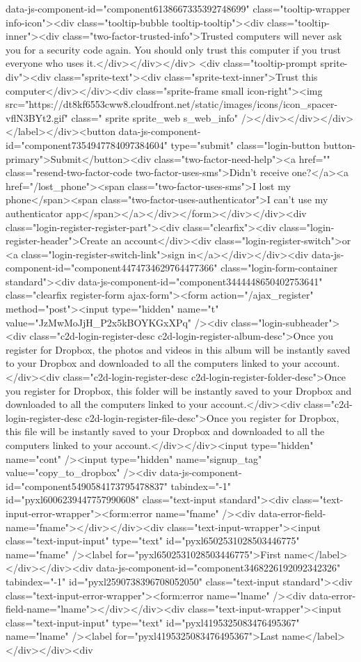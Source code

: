 {data-js-component-id="component6138667335392748699" class="tooltip-wrapper info-icon"><div class="tooltip-bubble tooltip-tooltip"><div class="tooltip-inner"><div class="two-factor-trusted-info">Trusted computers will never ask you for a security code again. You should only trust this computer if you trust everyone who uses it.</div></div></div> <div class="tooltip-prompt sprite-div"><div class="sprite-text"><div class="sprite-text-inner">Trust this computer</div></div><div class="sprite-frame small icon-right"><img src="https://dt8kf6553cww8.cloudfront.net/static/images/icons/icon_spacer-vflN3BYt2.gif" class=" sprite sprite_web s_web_info" /></div></div></div></label></div><button data-js-component-id="component7354947784097384604" type="submit" class="login-button button-primary">Submit</button><div class="two-factor-need-help"><a href="" class="resend-two-factor-code two-factor-uses-sms">Didn't receive one?</a><a href="/lost_phone"><span class="two-factor-uses-sms">I lost my phone</span><span class="two-factor-uses-authenticator">I can't use my authenticator app</span></a></div></form></div></div><div class="login-register-register-part"><div class="clearfix"><div class="login-register-header">Create an account</div><div class="login-register-switch">or <a class="login-register-switch-link">sign in</a></div></div><div data-js-component-id="component4474734629764477366" class="login-form-container standard"><div data-js-component-id="component3444448650402753641" class="clearfix register-form ajax-form"><form action="/ajax_register" method="post"><input type="hidden" name="t" value="JzMwMoJjH_P2x5kBOYKGxXPq" /><div class="login-subheader"><div class="c2d-login-register-desc c2d-login-register-album-desc">Once you register for Dropbox, the photos and videos in this album will be instantly saved to your Dropbox and downloaded to all the computers linked to your account.</div><div class="c2d-login-register-desc c2d-login-register-folder-desc">Once you register for Dropbox, this folder will be instantly saved to your Dropbox and downloaded to all the computers linked to your account.</div><div class="c2d-login-register-desc c2d-login-register-file-desc">Once you register for Dropbox, this file will be instantly saved to your Dropbox and downloaded to all the computers linked to your account.</div></div><input type="hidden" name="cont" /><input type="hidden" name="signup_tag" value="copy_to_dropbox" /><div data-js-component-id="component5490584173795478837" tabindex="-1" id="pyxl6006239447757990608" class="text-input  standard"><div class="text-input-error-wrapper"><form:error name="fname" /><div data-error-field-name="fname"></div></div><div class="text-input-wrapper"><input class="text-input-input" type="text" id="pyxl6502531028503446775" name="fname" /><label for="pyxl6502531028503446775">First name</label></div></div><div data-js-component-id="component3468226192092342326" tabindex="-1" id="pyxl2590738396708052050" class="text-input  standard"><div class="text-input-error-wrapper"><form:error name="lname" /><div data-error-field-name="lname"></div></div><div class="text-input-wrapper"><input class="text-input-input" type="text" id="pyxl4195325083476495367" name="lname" /><label for="pyxl4195325083476495367">Last name</label></div></div><div }
